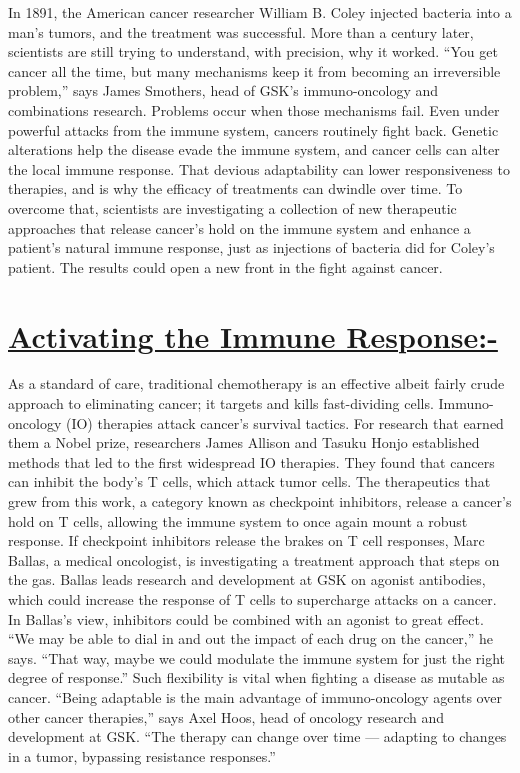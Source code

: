 \documentclass[12pt]{article}
\begin{document}
In 1891, the American cancer researcher William B. Coley injected bacteria into a man’s tumors, and the treatment was successful. More than a century later, scientists are still trying to understand, with precision, why it worked.
“You get cancer all the time, but many mechanisms keep it from becoming an irreversible problem,” says James Smothers, head of GSK’s immuno-oncology and combinations research. Problems occur when those mechanisms fail. Even under powerful attacks from the immune system, cancers routinely fight back. Genetic alterations help the disease evade the immune system, and cancer cells can alter the local immune response.
That devious adaptability can lower responsiveness to therapies, and is why the efficacy of treatments can dwindle over time. To overcome that, scientists are investigating a collection of new therapeutic approaches that release cancer’s hold on the immune system and enhance a patient’s natural immune response, just as injections of bacteria did for Coley’s patient. The results could open a new front in the fight against cancer.\par
\clearpage\par
\section{\underline{Activating the Immune Response:-}}

As a standard of care, traditional chemotherapy is an effective albeit fairly crude approach to eliminating cancer; it targets and kills fast-dividing cells. Immuno-oncology (IO) therapies attack cancer’s survival tactics. For research that earned them a Nobel prize, researchers James Allison and Tasuku Honjo established methods that led to the first widespread IO therapies. They found that cancers can inhibit the body’s T cells, which attack tumor cells. The therapeutics that grew from this work, a category known as checkpoint inhibitors, release a cancer’s hold on T cells, allowing the immune system to once again mount a robust response.
If checkpoint inhibitors release the brakes on T cell responses, Marc Ballas, a medical oncologist, is investigating a treatment approach that steps on the gas. Ballas leads research and development at GSK on agonist antibodies, which could increase the response of T cells to supercharge attacks on a cancer. In Ballas’s view, inhibitors could be combined with an agonist to great effect. “We may be able to dial in and out the impact of each drug on the cancer,” he says. “That way, maybe we could modulate the immune system for just the right degree of response.”
Such flexibility is vital when fighting a disease as mutable as cancer. “Being adaptable is the main advantage of immuno-oncology agents over other cancer therapies,” says Axel Hoos, head of oncology research and development at GSK. “The therapy can change over time — adapting to changes in a tumor, bypassing resistance responses.”
\end{document}
